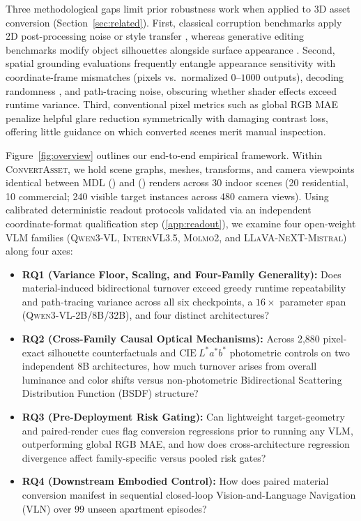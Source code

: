 Three methodological gaps limit prior robustness work when applied to 3D asset conversion (Section~\ref{sec:related}). First, classical corruption benchmarks apply 2D post-processing noise or style transfer \citep{Geirhos2019Texture,Hendrycks2019Benchmarking}, whereas generative editing benchmarks modify object silhouettes alongside surface appearance \citep{Zhang2024ImageNetD}. Second, spatial grounding evaluations frequently entangle appearance sensitivity with coordinate-frame mismatches (pixels vs.\ normalized $0\text{--}1000$ outputs), decoding randomness \citep{Zhao2021Calibrate}, and path-tracing noise, obscuring whether shader effects exceed runtime variance. Third, conventional pixel metrics such as global \textsc{RGB MAE} penalize helpful glare reduction symmetrically with damaging contrast loss, offering little guidance on which converted scenes merit manual inspection.

Figure~\ref{fig:overview} outlines our end-to-end empirical framework. Within \textsc{ConvertAsset}, we hold scene graphs, meshes, transforms, and camera viewpoints identical between \textsc{MDL} (\original) and \usdps{} (\converted) renders across 30 indoor scenes (20 residential, 10 commercial; 240 visible target instances across 480 camera views). Using calibrated deterministic readout protocols validated via an independent coordinate-format qualification step (\ref{app:readout}), we examine four open-weight \textsc{VLM} families (\textsc{Qwen3-VL}, \textsc{InternVL3.5}, \textsc{Molmo2}, and \textsc{LLaVA-NeXT-Mistral}) along four axes:
\begin{itemize}
    \item \textbf{RQ1 (Variance Floor, Scaling, and Four-Family Generality):} Does material-induced bidirectional turnover exceed greedy runtime repeatability and path-tracing variance across all six checkpoints, a $16\times$ parameter span (\textsc{Qwen3-VL-2B/8B/32B}), and four distinct architectures?
    \item \textbf{RQ2 (Cross-Family Causal Optical Mechanisms):} Across 2,880 pixel-exact silhouette counterfactuals and $\mathrm{CIE}~L^*a^*b^*$ photometric controls on two independent 8B architectures, how much turnover arises from overall luminance and color shifts versus non-photometric Bidirectional Scattering Distribution Function (\textsc{BSDF}) structure?
    \item \textbf{RQ3 (Pre-Deployment Risk Gating):} Can lightweight target-geometry and paired-render cues flag conversion regressions prior to running any \textsc{VLM}, outperforming global \textsc{RGB MAE}, and how does cross-architecture regression divergence affect family-specific versus pooled risk gates?
    \item \textbf{RQ4 (Downstream Embodied Control):} How does paired material conversion manifest in sequential closed-loop Vision-and-Language Navigation (\textsc{VLN}) over 99 unseen apartment episodes?
\end{itemize}

